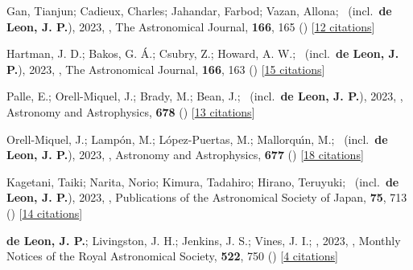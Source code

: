 \item[{\color{numcolor}\scriptsize56}] Gan, Tianjun; Cadieux, Charles; Jahandar, Farbod; Vazan, Allona; \etal\ (incl.\ \textbf{de Leon, J. P.}), 2023, , The Astronomical Journal, \textbf{166}, 165 () [\href{https://ui.adsabs.harvard.edu/abs/2023AJ....166..165G}{12 citations}]

\item[{\color{numcolor}\scriptsize55}] Hartman, J. D.; Bakos, G. {\'A}.; Csubry, Z.; Howard, A. W.; \etal\ (incl.\ \textbf{de Leon, J. P.}), 2023, , The Astronomical Journal, \textbf{166}, 163 () [\href{https://ui.adsabs.harvard.edu/abs/2023AJ....166..163H}{15 citations}]

\item[{\color{numcolor}\scriptsize54}] Palle, E.; Orell-Miquel, J.; Brady, M.; Bean, J.; \etal\ (incl.\ \textbf{de Leon, J. P.}), 2023, , Astronomy and Astrophysics, \textbf{678} () [\href{https://ui.adsabs.harvard.edu/abs/2023A&A...678A..80P}{13 citations}]

\item[{\color{numcolor}\scriptsize53}] Orell-Miquel, J.; Lamp{\'o}n, M.; L{\'o}pez-Puertas, M.; Mallorqu{\'\i}n, M.; \etal\ (incl.\ \textbf{de Leon, J. P.}), 2023, , Astronomy and Astrophysics, \textbf{677} () [\href{https://ui.adsabs.harvard.edu/abs/2023A&A...677A..56O}{18 citations}]

\item[{\color{numcolor}\scriptsize52}] Kagetani, Taiki; Narita, Norio; Kimura, Tadahiro; Hirano, Teruyuki; \etal\ (incl.\ \textbf{de Leon, J. P.}), 2023, , Publications of the Astronomical Society of Japan, \textbf{75}, 713 () [\href{https://ui.adsabs.harvard.edu/abs/2023PASJ...75..713K}{14 citations}]

\item[{\color{numcolor}\scriptsize51}] \textbf{de Leon, J. P.}; Livingston, J. H.; Jenkins, J. S.; Vines, J. I.; \etal, 2023, , Monthly Notices of the Royal Astronomical Society, \textbf{522}, 750 () [\href{https://ui.adsabs.harvard.edu/abs/2023MNRAS.522..750D}{4 citations}]

